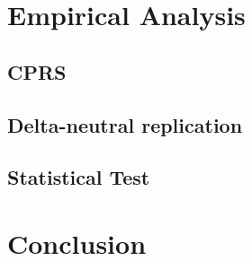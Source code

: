 \documentclass[12pt,a4paper]{article}
\numberwithin{equation}{section}
\begin{document}
\section{Empirical Analysis}

\subsection{CPRS}

\subsection{Delta-neutral replication}

\subsection{Statistical Test}

\section{Conclusion}
\end{document}
